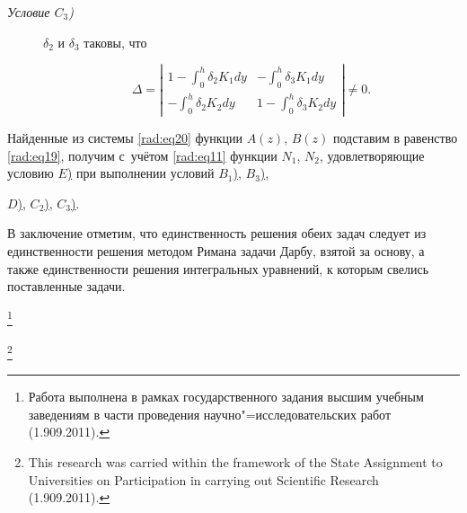 \begin{description}

\item[\sl Условие $C_3$\rm)]  \hypertarget{rad:C3}{} 

 $\delta_2$ и $\delta_3$ таковы, что %

$$ 

\Delta = 

\left| \begin{array}{cc} \displaystyle 1-  \int _0^h\delta_2 K_1 dy & \displaystyle -  \int _0^h\delta_3 K_1 dy\\[3mm]

\displaystyle-  \int _0^h\delta_2 K_2 dy & \displaystyle 1-  \int _0^h\delta_3 K_2 dy \end{array} \right| \not= 0. $$

\end{description}



Найденные из системы \eqref{rad:eq20} функции $A(z)$, $B(z)$ подставим в равенство \eqref{rad:eq19}, получим с~учётом \eqref{rad:eq11} функции $N_1$, $N_2$, удовлетворяющие условию \hyperlink{rad:E}{$E$)} при выполнении условий \hyperlink{rad:B1}{$B_1$)}, \hyperlink{rad:B3}{$B_3$)}, 

\hyperlink{rad:D}{$D$)}, \hyperlink{rad:C2}{$C_2$)}, \hyperlink{rad:C3}{$C_3$)}.



В заключение отметим, что единственность решения обеих задач следует из единственности решения методом Римана задачи Дарбу, взятой за основу, а также единственности решения интегральных уравнений, к которым свелись поставленные задачи.



\thanks{Работа выполнена в рамках государственного задания высшим учебным заведениям в части проведения научно"=исследовательских работ (1.909.2011).}


\thanks{This research was carried within the framework of the State Assignment to Universities on Participation in carrying out Scientific Research (1.909.2011).}










